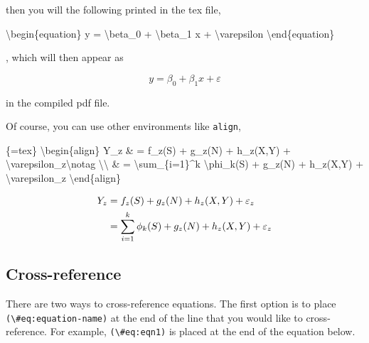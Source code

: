 \documentclass[
  letterpaper,
  DIV=11,
  numbers=noendperiod]{scrreprt}
\newenvironment{Shaded}{\begin{snugshade}}{\end{snugshade}}
\newcommand{\NormalTok}[1]{\textcolor[rgb]{0.00,0.23,0.31}{#1}}
\begin{document}
then you will the following printed in the tex file,

\begin{Shaded}
\begin{Highlighting}[]
\NormalTok{\textbackslash{}begin\{equation\}}
\NormalTok{y = \textbackslash{}beta\_0 + \textbackslash{}beta\_1 x + \textbackslash{}varepsilon}
\NormalTok{\textbackslash{}end\{equation\}}
\end{Highlighting}
\end{Shaded}

, which will then appear as

\begin{equation}
y = \beta_0 + \beta_1 x + \varepsilon
\end{equation}

in the compiled pdf file.

Of course, you can use other environments like \texttt{align},

\begin{Shaded}
\begin{Highlighting}[]
\NormalTok{\textasciigrave{}\textasciigrave{}\textasciigrave{}\{=tex\}}
\NormalTok{\textbackslash{}begin\{align\}}
\NormalTok{Y\_z \& = f\_z(S) + g\_z(N) + h\_z(X,Y) + \textbackslash{}varepsilon\_z\textbackslash{}notag \textbackslash{}\textbackslash{}}
\NormalTok{\& = \textbackslash{}sum\_\{i=1\}\^{}k \textbackslash{}phi\_k(S) + g\_z(N) + h\_z(X,Y) + \textbackslash{}varepsilon\_z}
\NormalTok{\textbackslash{}end\{align\}}
\NormalTok{\textasciigrave{}\textasciigrave{}\textasciigrave{}}
\end{Highlighting}
\end{Shaded}

\begin{align}
Y_z & = f_z(S) + g_z(N) + h_z(X,Y) + \varepsilon_z\notag \\
& = \sum_{i=1}^k \phi_k(S) + g_z(N) + h_z(X,Y) + \varepsilon_z
\end{align}

\hypertarget{cross-reference}{%
\subsection{Cross-reference}\label{cross-reference}}

There are two ways to cross-reference equations. The first option is to
place \texttt{(\textbackslash{}\#eq:equation-name)} at the end of the
line that you would like to cross-reference. For example,
\texttt{(\textbackslash{}\#eq:eqn1)} is placed at the end of the
equation below.
\end{document}

